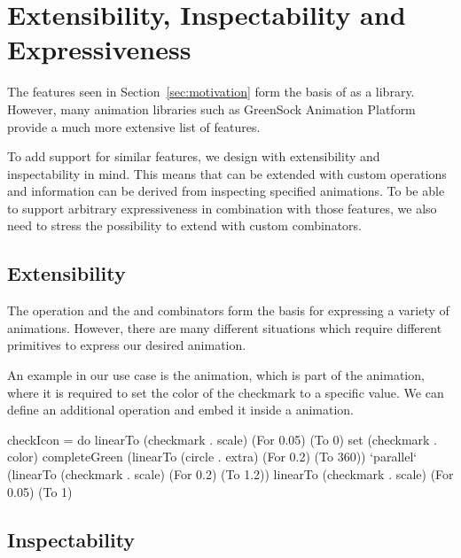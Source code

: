 \section{Extensibility, Inspectability and Expressiveness}
\label{sec:features}

The features seen in Section~\ref{sec:motivation} form the basis of \dsl{} as a library. However, many animation libraries such as GreenSock Animation Platform provide a much more extensive list of features.

To add support for similar features, we design \dsl{} with extensibility and inspectability in mind. This means that \dsl{} can be extended with custom operations and information can be derived from inspecting specified animations. To be able to support arbitrary expressiveness in combination with those features, we also need to stress the possibility to extend \dsl{} with custom combinators.

\subsection{Extensibility}
\label{sec:customop}

The  operation and the  and  combinators form the basis for expressing a variety of animations. However, there are many different situations which require different primitives to express our desired animation.

An example in our use case is the  animation, which is part of the  animation, where it is required to set the color of the checkmark to a specific value. We can define an additional  operation and embed it inside a \dsl{} animation.

\begin{spec}
checkIcon = do
  linearTo (checkmark . scale) (For 0.05) (To 0)
  set (checkmark . color) completeGreen
  (linearTo (circle . extra) (For 0.2) (To 360))
    `parallel`
    (linearTo (checkmark . scale) (For 0.2) (To 1.2))
  linearTo (checkmark . scale) (For 0.05) (To 1)
\end{spec}


\subsection{Inspectability}

